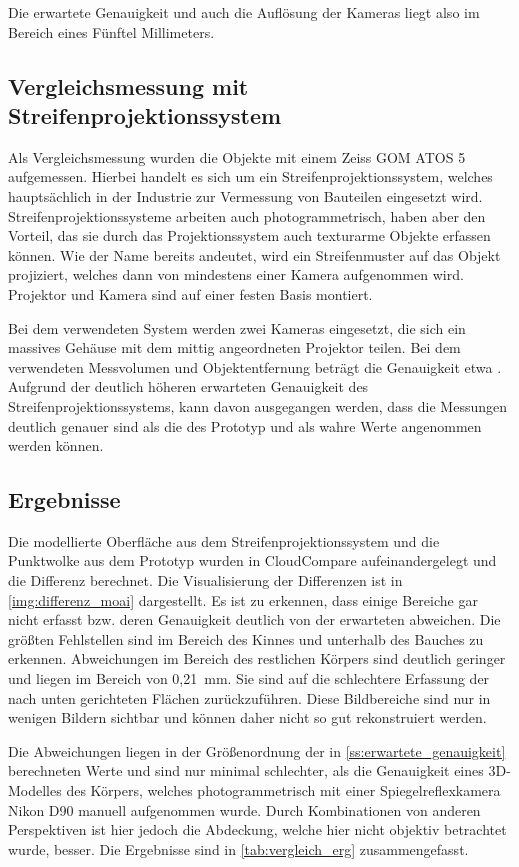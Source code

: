 \documentclass[./00PhotoBox.tex]{subfiles}
\begin{document}
Die erwartete Genauigkeit und auch die Auflösung der Kameras liegt also im Bereich eines Fünftel Millimeters.


\subsection{Vergleichsmessung mit Streifenprojektionssystem}
Als Vergleichsmessung wurden die Objekte mit einem Zeiss GOM ATOS 5 aufgemessen. Hierbei handelt es sich um ein Streifenprojektionssystem, welches hauptsächlich in der Industrie zur Vermessung von Bauteilen eingesetzt wird. Streifenprojektionssysteme arbeiten auch photogrammetrisch, haben aber den Vorteil, das sie durch das Projektionssystem auch texturarme Objekte erfassen können. Wie der Name bereits andeutet, wird ein Streifenmuster auf das Objekt projiziert, welches dann von mindestens einer Kamera aufgenommen wird. Projektor und Kamera sind auf einer festen Basis montiert. \citep[S. 581f]{luhmann}

Bei dem verwendeten System werden zwei Kameras eingesetzt, die sich ein massives Gehäuse mit dem mittig angeordneten Projektor teilen. Bei dem verwendeten Messvolumen und Objektentfernung beträgt die Genauigkeit etwa . Aufgrund der deutlich höheren erwarteten Genauigkeit des Streifenprojektionssystems, kann davon ausgegangen werden, dass die Messungen deutlich genauer sind als die des Prototyp und als wahre Werte angenommen werden können.

\subsection{Ergebnisse}
Die modellierte Oberfläche aus dem Streifenprojektionssystem und die Punktwolke aus dem Prototyp wurden in CloudCompare aufeinandergelegt und die Differenz berechnet. Die Visualisierung der Differenzen ist in \autoref{img:differenz_moai} dargestellt. Es ist zu erkennen, dass einige Bereiche gar nicht erfasst bzw. deren Genauigkeit deutlich von der erwarteten abweichen. Die größten Fehlstellen sind im Bereich des Kinnes und unterhalb des Bauches zu erkennen. Abweichungen im Bereich des restlichen Körpers sind deutlich geringer und liegen im Bereich von 0,21~mm. Sie sind auf die schlechtere Erfassung der nach unten gerichteten Flächen zurückzuführen. Diese Bildbereiche sind nur in wenigen Bildern sichtbar und können daher nicht so gut rekonstruiert werden.

Die Abweichungen liegen in der Größenordnung der in \autoref{ss:erwartete_genauigkeit} berechneten Werte und sind nur minimal schlechter, als die Genauigkeit eines 3D-Modelles des Körpers, welches photogrammetrisch mit einer Spiegelreflexkamera Nikon D90 manuell aufgenommen wurde. Durch Kombinationen von anderen Perspektiven ist hier jedoch die Abdeckung, welche hier nicht objektiv betrachtet wurde, besser. Die Ergebnisse sind in \autoref{tab:vergleich_erg} zusammengefasst.
\end{document}
